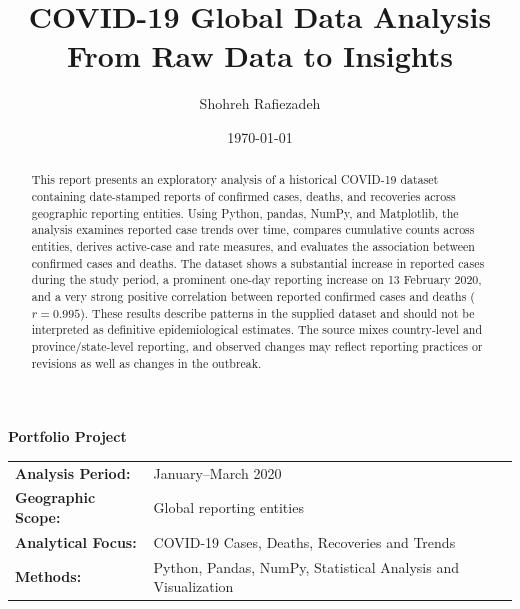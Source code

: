 \documentclass[11pt,a4paper]{article}
\title{\textbf{COVID-19 Global Data Analysis}\\
 \vspace{1cm}
\large \textbf{From Raw Data to Insights}}
\author{Shohreh Rafiezadeh}
\date{\today}
\begin{document}
\maketitle

 \begin{center}  
 \vspace{1cm}
  {\textbf{\Large Portfolio Project}}
 \end{center}   
   
  \vspace{}     
    
\begin{tabular}{ll}
    \textbf{Analysis Period:} & January--March 2020 \\
    \textbf{Geographic Scope:} & Global reporting entities \\
    \textbf{Analytical Focus:} & COVID-19 Cases, Deaths, Recoveries and Trends \\
    \textbf{Methods:} & Python, Pandas, NumPy, Statistical Analysis and Visualization
\end{tabular}


   
    
 
    
    
    
    
\vspace{1cm}
\begin{abstract}
\large This report presents an exploratory analysis of a historical COVID-19 dataset containing date-stamped reports of confirmed cases, deaths, and recoveries across geographic reporting entities. Using Python, pandas, NumPy, and Matplotlib, the analysis examines reported case trends over time, compares cumulative counts across entities, derives active-case and rate measures, and evaluates the association between confirmed cases and deaths. The dataset shows a substantial increase in reported cases during the study period, a prominent one-day reporting increase on 13 February 2020, and a very strong positive correlation between reported confirmed cases and deaths ($r=0.995$). These results describe patterns in the supplied dataset and should not be interpreted as definitive epidemiological estimates. The source mixes country-level and province/state-level reporting, and observed changes may reflect reporting practices or revisions as well as changes in the outbreak.
\end{abstract}
\newpage
\tableofcontents
\newpage
\end{document}
